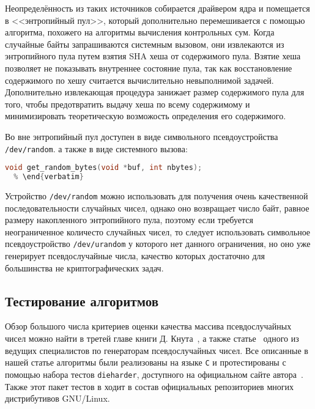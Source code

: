 \documentclass[%
floatfix,
showkeys,
nofootinbib, %
superscriptaddress, %
]{revtex4-1}
\begin{document}
Неопределённость из таких источников собирается драйвером ядра и
помещается в <<энтропийный пул>>, который дополнительно перемешивается
с помощью алгоритма, похожего на алгоритмы вычисления контрольных
сум. Когда случайные байты запрашиваются системным вызовом, они
извлекаются из энтропийного пула путем взятия SHA хеша от содержимого
пула. Взятие хеша позволяет не показывать внутреннее состояние пула,
так как восстановление содержимого по хешу считается вычислительно
невыполнимой задачей. Дополнительно извлекающая процедура занижает
размер содержимого пула для того, чтобы предотвратить выдачу хеша по
всему содержимому и минимизировать теоретическую возможость
определения его содержимого.

Во вне энтропийный пул доступен в виде символьного псевдоустройства
\texttt{/dev/random}. а также в виде системного вызова:
\begin{lstlisting}[language=C]
  void get_random_bytes(void *buf, int nbytes);
  % \end{verbatim}
\end{lstlisting}
Устройство \texttt{/dev/random} можно использовать для получения очень
качественной последовательности случайных чисел, однако оно возвращает
число байт, равное размеру накопленного энтропийного пула, поэтому
если требуется неограниченное количесто случайных чисел, то следует
использовать символьное псевдоустройство \texttt{/dev/urandom} у
которого нет данного ограничения, но оно уже генерирует
псевдослучайные числа, качество которых достаточно для большинства не
криптографических задач.

\subsection{Тестирование алгоритмов}
Обзор большого числа критериев оценки качества массива псевдослучайных
чисел можно найти в третей главе книги
Д. Кнута~\cite{L_DKnuth:2004:ru}, а также
статье~\cite{L_Ecuyer:2007} одного из ведущих специалистов по
генераторам псевдослучайных чисел. Все описанные в нашей статье
алгоритмы были реализованы на языке \texttt{C} и протестированы с
помощью набора тестов \texttt{dieharder}, доступного на официальном
сайте автора~\cite{L_DieHarder:2013}. Также этот пакет тестов в ходит
в состав официальных репозиториев многих дистрибутивов GNU/Linux.
\end{document}
